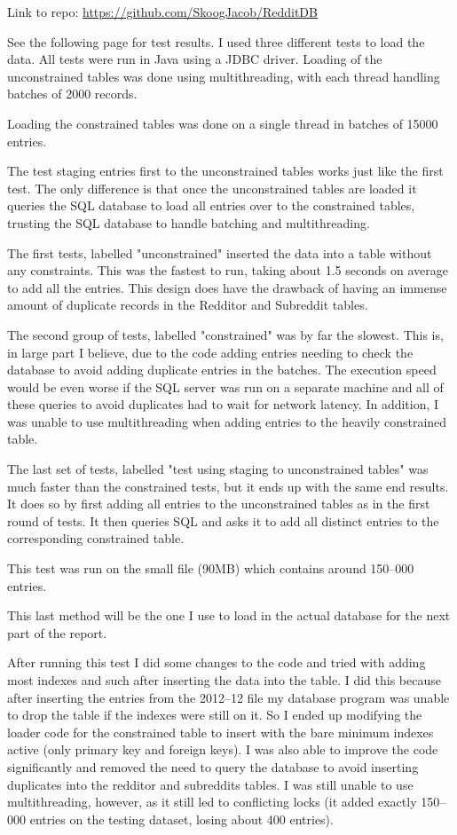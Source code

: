 Link to repo: \url{https://github.com/SkoogJacob/RedditDB}

See the following page for test results.
I used three different tests to load the data.
All tests were run in Java using a JDBC driver.
Loading of the unconstrained tables was done using multithreading, with each thread handling batches of 2000 records.

Loading the constrained tables was done on a single thread in batches of 15000 entries.

The test staging entries first to the unconstrained tables works just like the first test.
The only difference is that once the unconstrained tables are loaded it queries the SQL database to load all entries over to the constrained tables, trusting the SQL database to handle batching and multithreading.

The first tests, labelled "unconstrained" inserted the data into a table without any constraints.
This was the fastest to run, taking about 1.5 seconds on average to add all the entries.
This design does have the drawback of having an immense amount of duplicate records in the Redditor and Subreddit tables.

The second group of tests, labelled "constrained" was by far the slowest.
This is, in large part I believe, due to the code adding entries needing to check the database to avoid adding duplicate entries in the batches.
The execution speed would be even worse if the SQL server was run on a separate machine and all of these queries to avoid duplicates had to wait for network latency.
In addition, I was unable to use multithreading when adding entries to the heavily constrained table.

The last set of tests, labelled "test using staging to unconstrained tables" was much faster than the constrained tests, but it ends up with the same end results.
It does so by first adding all entries to the unconstrained tables as in the first round of tests.
It then queries SQL and asks it to add all distinct entries to the corresponding constrained table.

This test was run on the small file (90MB) which contains around 150--000 entries.

This last method will be the one I use to load in the actual database for the next part of the report.


After running this test I did some changes to the code and tried with adding most indexes and such after inserting the data into the table.
I did this because after inserting the entries from the 2012--12 file my database program was unable to drop the table if the indexes were still on it.
So I ended up modifying the loader code for the constrained table to insert with the bare minimum indexes active (only primary key and foreign keys).
I was also able to improve the code significantly and removed the need to query the database to avoid inserting duplicates into the redditor and
subreddits tables.
I was still unable to use multithreading, however, as it still led to conflicting locks (it added exactly 150--000 entries on the testing dataset, losing about 400 entries).

